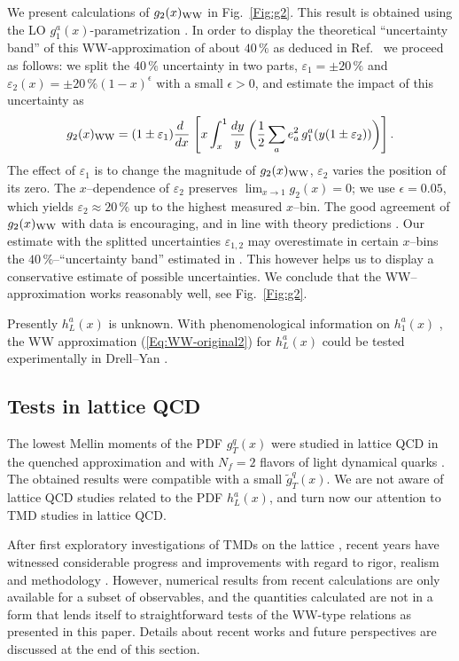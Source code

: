 \documentclass[a4paper,11pt]{article}
\newcommand{\be}{\begin{equation}}
\newcommand{\ee}{\end{equation}}
\begin{document}
We present calculations of $g_2(x)_{\rm WW}$ in Fig.~\ref{Fig:g2}.
This result is obtained using the LO $g_1^a(x)$-parametrization 
\cite{Gluck:1998xa}. In order to display the theoretical ``uncertainty 
band'' of this WW-approximation of about $40\,\%$ as deduced in 
Ref.~\cite{Accardi:2009au} we proceed as follows: we split the 
$40\,\%$ uncertainty in two parts, $\varepsilon_1=\pm 20\,\%$ and 
$\varepsilon_2(x)=\pm 20\,\%(1-x)^\epsilon$ with a small $\epsilon>0$,
and estimate the impact of this uncertainty as 
\be\label{Eq:g2-in-WW-model-violation}
    g_2(x)_{\rm WW} = (1\pm\varepsilon_1)\frac{ d\;}{ d x}\;\Biggl[
    x\int_x^1\frac{ d y}{y} \,\biggl(
    \frac12\sum_ae_a^2\,g_1^a(y(1\pm\varepsilon_2))\biggr)\Biggr]\,.
\ee
The effect of $\varepsilon_1$ is to change the magnitude
of $g_2(x)_{\rm WW}$, $\varepsilon_2$ varies the position of its zero.
The $x$--dependence of $\varepsilon_2$ preserves $\lim_{x\to1}g_2(x)= 0$; 
we use $\epsilon=0.05$, which yields $\varepsilon_2\approx 20\,\%$ up to 
the highest measured $x$--bin.
The good agreement of $g_2(x)_{\rm WW}$ with data is encouraging,
and in line with theory predictions \cite{Balla:1997hf}.
Our estimate with the splitted uncertainties 
$\varepsilon_{1,2}$ may overestimate in certain $x$--bins the 
$40\,\%$--``uncertainty band'' estimated in \cite{Accardi:2009au}. 
This however helps us to display a conservative estimate of possible 
uncertainties. 
We conclude that the WW--approximation works reasonably well, 
see Fig.~\ref{Fig:g2}.

Presently $h_L^a(x)$ is unknown.
With phenomenological information on $h_1^a(x)$
\cite{Efremov:2006qm,Anselmino:2007fs,Anselmino:2008jk}, 
the WW approximation (\ref{Eq:WW-original2}) for $h_L^a(x)$ could 
be tested experimentally in Drell--Yan \cite{Koike:2008du}.


\subsection{Tests in lattice QCD}
\label{Sec-3.5:WW-lattice}

The lowest Mellin moments of the PDF $g_T^q(x)$ were studied in
lattice QCD in the quenched approximation \cite{Gockeler:2000ja} 
and with $N_f = 2$ flavors of light dynamical quarks \cite{Gockeler:2005vw}.
The obtained results were compatible with a small $\tilde{g}_T^q(x)$. 
We are not aware of lattice QCD studies related to the PDF $h_L^a(x)$,
and turn now our attention to TMD studies in lattice QCD.

After first exploratory investigations of TMDs on the lattice
\cite{Hagler:2009mb,Musch:2010ka}, recent years have witnessed considerable
progress and improvements with regard to rigor, realism and methodology
\cite{Yoon:2017qzo, %
Engelhardt:2015xja,%
Ji:2014hxa,%
Musch:2011er%
}.
However, numerical results from recent calculations are only available 
for a subset of observables, and the quantities calculated are not in a 
form that lends itself to straightforward tests of the WW-type relations 
as presented in this paper. Details about recent works and future 
perspectives are discussed at the end of this section.
\end{document}
